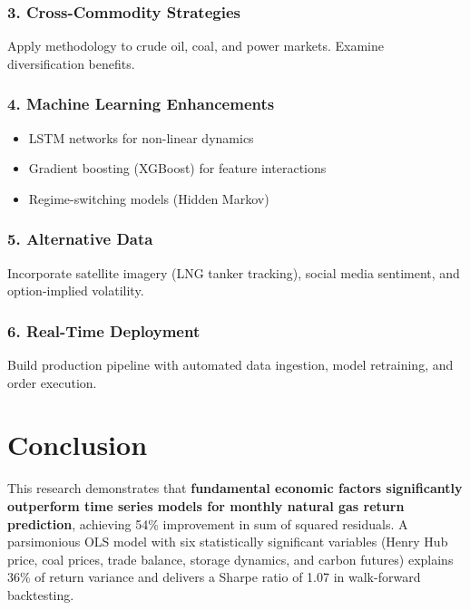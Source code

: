 \documentclass[12pt,a4paper]{article}
\begin{document}
\subsubsection{3. Cross-Commodity Strategies}

Apply methodology to crude oil, coal, and power markets. Examine diversification benefits.

\subsubsection{4. Machine Learning Enhancements}

\begin{itemize}
    \item LSTM networks for non-linear dynamics
    \item Gradient boosting (XGBoost) for feature interactions
    \item Regime-switching models (Hidden Markov)
\end{itemize}

\subsubsection{5. Alternative Data}

Incorporate satellite imagery (LNG tanker tracking), social media sentiment, and option-implied volatility.

\subsubsection{6. Real-Time Deployment}

Build production pipeline with automated data ingestion, model retraining, and order execution.

\newpage
\section{Conclusion}

This research demonstrates that \textbf{fundamental economic factors significantly outperform time series models for monthly natural gas return prediction}, achieving 54\% improvement in sum of squared residuals. A parsimonious OLS model with six statistically significant variables (Henry Hub price, coal prices, trade balance, storage dynamics, and carbon futures) explains 36\% of return variance and delivers a Sharpe ratio of 1.07 in walk-forward backtesting.
\end{document}
